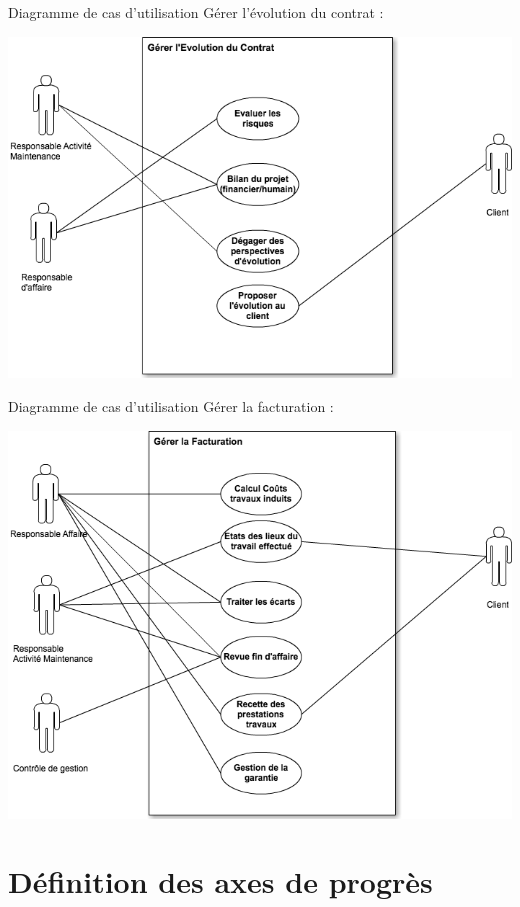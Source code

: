 Diagramme de cas d'utilisation Gérer l'évolution du contrat : 
\begin {center}
\includegraphics[width=\textwidth]{png_generaux/DCUGererEvolutionContrat.png}
\end {center}

Diagramme de cas d'utilisation Gérer la facturation :
\begin {center}
\includegraphics[width=\textwidth]{png_generaux/DCUGererFacturation.png}
\end {center}

\section{Définition des axes de progrès}


